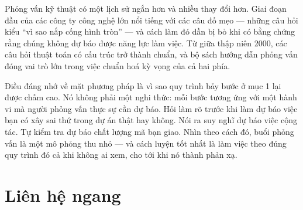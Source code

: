 \documentclass[../../algorithm.tex]{subfiles}
\begin{document}
Phỏng vấn kỹ thuật có một lịch sử ngắn hơn và nhiều thay đổi hơn. Giai đoạn đầu của các công ty công nghệ lớn nổi tiếng với các câu đố mẹo --- những câu hỏi kiểu ``vì sao nắp cống hình tròn'' --- và cách làm đó dần bị bỏ khi có bằng chứng rằng chúng không dự báo được năng lực làm việc. Từ giữa thập niên 2000, các câu hỏi thuật toán có cấu trúc trở thành chuẩn, và bộ sách hướng dẫn phỏng vấn\cite{mcdowell2015} đóng vai trò lớn trong việc chuẩn hoá kỳ vọng của cả hai phía.

Điều đáng nhớ về mặt phương pháp là vì sao quy trình bảy bước ở mục 1 lại được chấm cao. Nó không phải một nghi thức: mỗi bước tương ứng với một hành vi mà người phỏng vấn thực sự cần dự báo. Hỏi làm rõ trước khi làm dự báo việc bạn có xây sai thứ trong dự án thật hay không. Nói ra suy nghĩ dự báo việc cộng tác. Tự kiểm tra dự báo chất lượng mã bạn giao. Nhìn theo cách đó, buổi phỏng vấn là một mô phỏng thu nhỏ --- và cách luyện tốt nhất là làm việc theo đúng quy trình đó cả khi không ai xem, cho tới khi nó thành phản xạ.

\begin{gocre}
\end{gocre}

\section{Liên hệ ngang}
\end{document}

